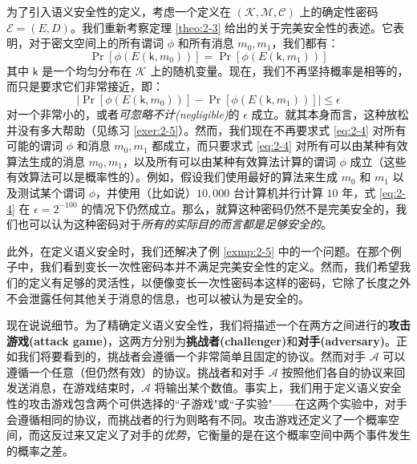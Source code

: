为了引入语义安全性的定义，考虑一个定义在 $(\mathcal{K},\mathcal{M},\mathcal{C})$ 上的确定性密码 $\mathcal{E}=(E,D)$。我们重新考察定理 \ref{theo:2-3} 给出的关于完美安全性的表述。它表明，对于密文空间上的所有谓词 $\phi$ 和所有消息 $m_0,m_1$，我们都有：
\begin{equation}\label{eq:2-3}
\Pr[\phi(E(\boldsymbol{\mathsf{k}},m_0))]=\Pr[\phi(E(\boldsymbol{\mathsf{k}}, m_1))]
\end{equation}
其中 $\boldsymbol{\mathsf{k}}$ 是一个均匀分布在 $\mathcal{K}$ 上的随机变量。现在，我们不再坚持概率是相等的，而只是要求它们非常接近，即：
\begin{equation}\label{eq:2-4}
\Big\lvert
\Pr[\phi(E(\boldsymbol{\mathsf{k}},m_0))]-\Pr[\phi(E(\boldsymbol{\mathsf{k}}, m_1))]
\Big\rvert
\leq\epsilon
\end{equation}
对一个非常小的，或者\emph{可忽略不计(negligible)}的 $\epsilon$ 成立。就其本身而言，这种放松并没有多大帮助（见练习 \ref{exer:2-5}）。然而，我们现在不再要求式 \ref{eq:2-4} 对所有可能的谓词 $\phi$ 和消息 $m_0,m_1$ 都成立，而只要求式 \ref{eq:2-4} 对所有可以由某种有效算法生成的消息 $m_0,m_1$，以及所有可以由某种有效算法计算的谓词 $\phi$ 成立（这些有效算法可以是概率性的）。例如，假设我们使用最好的算法来生成 $m_0$ 和 $m_1$ 以及测试某个谓词 $\phi$，并使用（比如说）$10,000$ 台计算机并行计算 $10$ 年，式 \ref{eq:2-4} 在 $\epsilon = 2^{-100}$ 的情况下仍然成立。那么，就算这种密码仍然不是完美安全的，我们也可以认为这种密码对于\emph{所有的实际目的而言都是足够安全的}。

此外，在定义语义安全时，我们还解决了例 \ref{exmp:2-5} 中的一个问题。在那个例子中，我们看到变长一次性密码本并不满足完美安全性的定义。然而，我们希望我们的定义有足够的灵活性，以便像变长一次性密码本这样的密码，它除了长度之外不会泄露任何其他关于消息的信息，也可以被认为是安全的。

现在说说细节。为了精确定义语义安全性，我们将描述一个在两方之间进行的\textbf{攻击游戏(attack game)}，这两方分别为\textbf{挑战者(challenger)}和\textbf{对手(adversary)}。正如我们将要看到的，挑战者会遵循一个非常简单且固定的协议。然而对手 $\mathcal{A}$ 可以遵循一个任意（但仍然有效）的协议。挑战者和对手 $\mathcal{A}$ 按照他们各自的协议来回发送消息，在游戏结束时，$\mathcal{A}$ 将输出某个数值。事实上，我们用于定义语义安全性的攻击游戏包含两个可供选择的``子游戏"或``子实验"——在这两个实验中，对手会遵循相同的协议，而挑战者的行为则略有不同。攻击游戏还定义了一个概率空间，而这反过来又定义了对手的\emph{优势}，它衡量的是在这个概率空间中两个事件发生的概率之差。

